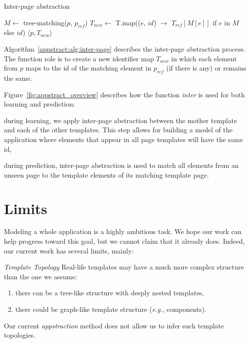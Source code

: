 \begin{algorithm}
    \caption{Inter-page abstraction}\label{appstract:alg:inter-page}
    \begin{algorithmic}[1]
          \State $M \gets$ tree-matching($p$, $p_{ref}$)
          \State $T_{new} \gets$ T.map(($e$, $id$) $\to$ $T_{ref}[M[e]]$ if $e$ in $M$ else $id$)
          \State \Return $\langle p, T_{new} \rangle$
      \EndFunction
    \end{algorithmic}
\end{algorithm}

Algorithm~\ref{appstract:alg:inter-page} describes the inter-page abstraction process.
The function role is to create a new identifier map $T_{new}$ in which each element from $p$ maps to the id of the matching element in $p_{ref}$ (if there is any) or remains the same.

Figure~\ref{fig:appstract_overview} describes how the function \emph{inter} is used for both learning and prediction:
\begin{compactenum}
    \item during learning, we apply inter-page abstraction between the mother template and each of the other templates. This step allows for building a model of the application where elements that appear in all page templates will have the same id,
    \item during prediction, inter-page abstraction is used to match all elements from an unseen page to the template elements of its matching template page.
\end{compactenum}

\section{Limits}
Modeling a whole application is a highly ambitious task.
We hope our work can help progress toward this goal, but we cannot claim that it already does.
Indeed, our current work has several limits, mainly:

\emph{Template Topology}
Real-life templates may have a much more complex structure than the one we assume:
\begin{enumerate}
\item there can be a tree-like structure with deeply nested templates,
\item there could be graph-like template structure (\emph{e.g.}, components).
\end{enumerate}
Our current \emph{appstraction} method does not allow us to infer such template topologies.

